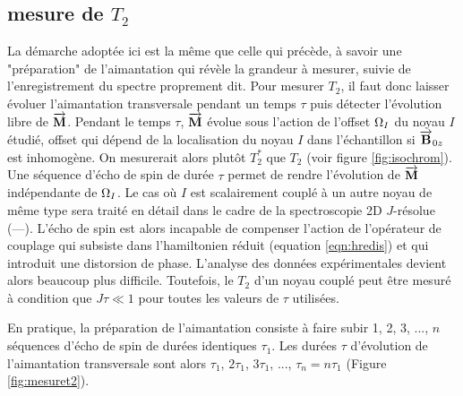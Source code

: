 \subsection{mesure de $T_2$}
La démarche adoptée ici est la même que celle qui précède, à savoir une
"préparation" de l'aimantation qui révèle la grandeur à mesurer,
suivie de l'enregistrement du spectre proprement dit.
Pour mesurer $T_2$, il faut donc laisser évoluer l'aimantation transversale
pendant un temps $\tau$ puis détecter l'évolution libre de $\overrightarrow{\mathbf{M}}$.
Pendant le temps $\tau$, $\overrightarrow{\mathbf{M}}$ évolue sous l'action de l'offset $\Omega_I$
du noyau $I$ étudié, offset qui dépend de la localisation du noyau $I$
dans l'échantillon si $\overrightarrow{\mathbf{B}}_{0z}$ est inhomogène.
On mesurerait alors plutôt $T_2^*$ que $T_2$ (voir figure \ref{fig:isochrom}).
Une séquence d'écho de spin de durée $\tau$ permet de rendre l'évolution
de $\overrightarrow{\mathbf{M}}$ indépendante de $\Omega_I$.
Le cas où $I$ est scalairement couplé à un autre noyau de même type
sera traité en détail dans le cadre de la spectroscopie 2D $J$-résolue (---).
L'écho de spin est alors incapable de compenser l'action de l'opérateur 
de couplage qui subsiste dans l'hamiltonien réduit 
(equation \ref{eqn:hredis}) et qui introduit
une distorsion de phase.
L'analyse des données expérimentales devient alors
beaucoup plus difficile.
Toutefois, le $T_2$ d'un noyau couplé peut être mesuré
à condition que $J \tau \ll 1$ pour toutes les valeurs de $\tau$ utilisées.

En pratique, la préparation de l'aimantation consiste à faire subir
1, 2, 3, ..., $n$ séquences d'écho de spin de durées identiques $\tau_1$.
Les durées $\tau$ d'évolution de l'aimantation transversale sont alors
$\tau_1$, $2\tau_1$, $3\tau_1$, ..., $\tau_n = n\tau_1$ (Figure \ref{fig:mesuret2}).

